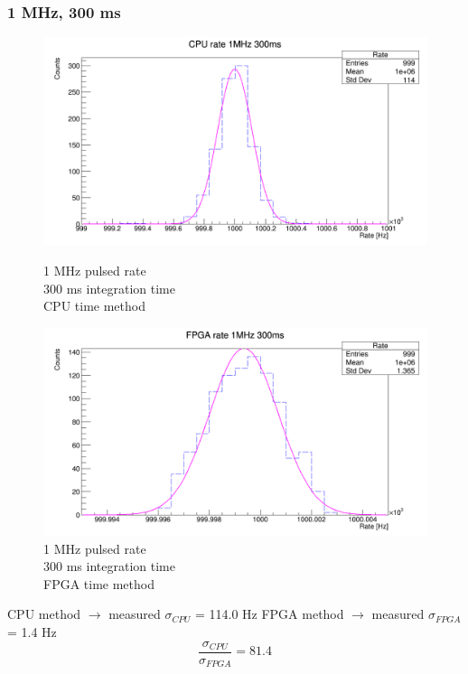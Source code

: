 \subsubsection{1 MHz, 300 ms}
\begin{figure}[H]
	\centering
	\begin{minipage}{0.49\textwidth}
		\centering
		\includegraphics[width=.99\linewidth]{IMG/ch5/RateMeasures/CPU-time-rate-1MHz-300ms}
		\caption{1 MHz pulsed rate\\300 ms integration time\\CPU time method}
		\label{fig:CPU-time-rate-1MHz-300ms}
	\end{minipage}%
	\begin{minipage}{0.49\textwidth}
		\centering
		\includegraphics[width=.99\linewidth]{IMG/ch5/RateMeasures/FPGA-time-rate-1MHz-300ms}
		\caption{1 MHz pulsed rate\\300 ms integration time\\FPGA time method}
		\label{fig:FPGA-time-rate-1MHz-300ms}
	\end{minipage}
\end{figure}
\noindent CPU method $\rightarrow$ measured $\sigma_{CPU}$ = 114.0 Hz
\newline
FPGA method $\rightarrow$ measured $\sigma_{FPGA}$ = 1.4 Hz
\begin{equation}
	\frac{\sigma_{CPU}}{\sigma_{FPGA}} = 81.4
\end{equation}

